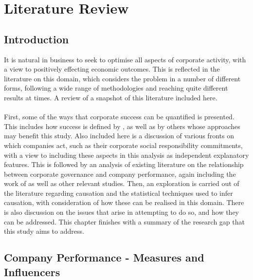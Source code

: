 %
%
%
\chapter{Literature Review}\label{C.LitReview}
\section{Introduction}\label{S.intro3}
{It is natural in business to seek to optimise all aspects of corporate activity, with a view to positively effecting economic outcomes. This is reflected in the literature on this domain, which considers the problem in a number of different forms, following a wide range of methodologies and reaching quite different results at times. A review of a snapshot of this literature included here. \\\\
First, some of the ways that corporate success can be quantified is presented. This includes how success is defined by \cite{moldovan2015learning}, as well as by others whose approaches may benefit this study. Also included here is a discussion of various fronts on which companies act, such as their corporate social responsibility commitments, with a view to including these aspects in this analysis as independent explanatory features. This is followed by an analysis of existing literature on the relationship between corporate governance and company performance, again including the work of \cite{moldovan2015learning} as well as other relevant studies. Then, an exploration is carried out of the literature regarding causation and the statistical techniques used to infer causation, with consideration of how these can be realised in this domain. There is also discussion on the issues that arise in attempting to do so, and how they can be addressed. This chapter finishes with a summary of the research gap that this study aims to address. }
\section{Company Performance - Measures and Influencers}\label{comPerform}
